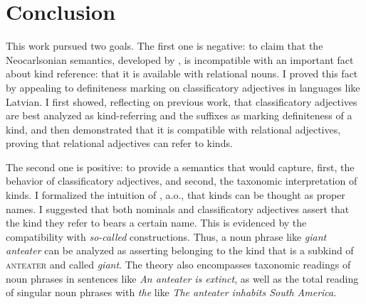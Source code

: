 \documentclass[a4paper, 12pt]{article}
\begin{document}





\section{Conclusion}\label{conc}

This work pursued two goals. The first one is negative: to claim that the Neocarlsonian semantics, developed by \textcite{chierchia1998referencekindslanguages}, is incompatible with an important fact about kind reference: that it is available with relational nouns. I proved this fact by appealing to definiteness marking on classificatory adjectives in languages like Latvian. I first showed, reflecting on previous work, that classificatory adjectives are best analyzed as kind-referring and the suffixes as marking definiteness of a kind, and then demonstrated that it is compatible with relational adjectives, proving that relational adjectives can refer to kinds.

The second one is positive: to provide a semantics that would capture, first, the behavior of classificatory adjectives, and second, the taxonomic interpretation of kinds. I formalized the intuition of \textcite{carlson1977referencekindsenglish}, a.o., that kinds can be thought as proper names. I suggested that both nominals and classificatory adjectives assert that the kind they refer to bears a certain name. This is evidenced by the compatibility with \textit{so-called} constructions. Thus, a noun phrase like \textit{giant anteater} can be analyzed as asserting belonging to the kind that is a subkind of \textsc{anteater} and called \textit{giant}. The theory also encompasses taxonomic readings of noun phrases in sentences like \textit{An anteater is extinct}, as well as the total reading of singular noun phrases with \textit{the} like \textit{The anteater inhabits South America}.
\end{document}
